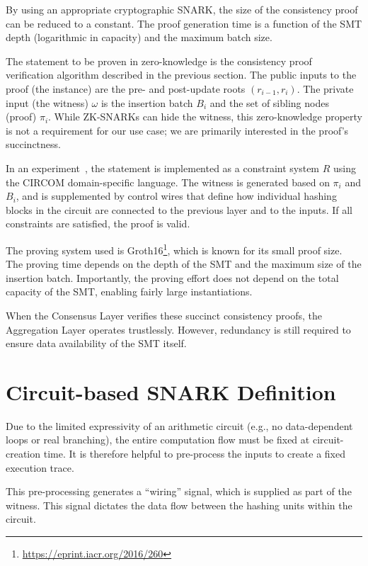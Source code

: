 \documentclass[twocolumn]{article}
\begin{document}
By using an appropriate cryptographic SNARK, the size of the consistency proof can be reduced to a constant. The proof generation time is a function of the SMT depth (logarithmic in capacity) and the maximum batch size.

The statement to be proven in zero-knowledge is the consistency proof verification algorithm described in the previous section. The public inputs to the proof (the instance) are the pre- and post-update roots $(r_{i-1}, r_i)$. The private input (the witness) $\omega$ is the insertion batch $B_i$ and the set of sibling nodes (proof) $\pi_i$. While ZK-SNARKs can hide the witness, this zero-knowledge property is not a requirement for our use case; we are primarily interested in the proof's succinctness.

In an experiment~\cite{snark}, the statement is implemented as a constraint system $R$ using the CIRCOM domain-specific language. The witness is generated based on $\pi_i$ and $B_i$, and is supplemented by control wires that define how individual hashing blocks in the circuit are connected to the previous layer and to the inputs. If all constraints are satisfied, the proof is valid.

The proving system used is Groth16\footnote{\url{https://eprint.iacr.org/2016/260}}, which is known for its small proof size. The proving time depends on the depth of the SMT and the maximum size of the insertion batch. Importantly, the proving effort does not depend on the total capacity of the SMT, enabling fairly large instantiations.

When the Consensus Layer verifies these succinct consistency proofs, the Aggregation Layer operates trustlessly. However, redundancy is still required to ensure data availability of the SMT itself.


\section{Circuit-based SNARK Definition}

Due to the limited expressivity of an arithmetic circuit (e.g., no data-dependent loops or real branching), the entire computation flow must be fixed at circuit-creation time. It is therefore helpful to pre-process the inputs to create a fixed execution trace.

This pre-processing generates a ``wiring'' signal, which is supplied as part of the witness. This signal dictates the data flow between the hashing units within the circuit.
\end{document}

